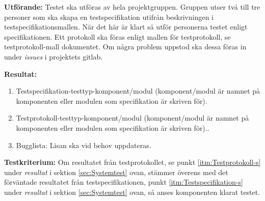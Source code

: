 \documentclass[a4paper,10pt]{article}
\begin{document}
\textbf{Utförande:} Testet ska utföras av hela projektgruppen. Gruppen utser två till tre personer som ska skapa en testspecifikation utifrån beskrivningen i testspecifikationsmallen. När det här är klart så utför personerna testet enligt specifikationen. Ett protokoll ska föras enligt mallen för testprotokoll, se testprotokoll-mall dokumentet. Om några problem uppstod ska dessa föras in under \emph{issues} i projektets gitlab.

\textbf{Resultat:}
    \begin{enumerate}
        \item \label{itm:Testspecifikation-a} Testspecifikation-testtyp-komponent/modul (komponent/modul är namnet på komponenten eller modulen som specifikation är skriven för).
        \item \label{itm:Testprotokoll-a} Testprotokoll-testtyp-komponent/modul (komponent/modul är namnet på komponenten eller modulen som specifikation är skriven för)..
        \item Bugglista: Lisan ska vid behov uppdateras.
    \end{enumerate}

\textbf{Testkriterium:} Om resultatet från testprotokollet, se punkt \ref{itm:Testprotokoll-s} under \emph{resultat} i sektion \ref{sec:Systemtest} ovan, stämmer överens med det förväntade resultatet från testspecifikationen, punkt \ref{itm:Testspecifikation-s} under \emph{resultat} i sektion \ref{sec:Systemtest} ovan, så anses komponenten klarat testet.
\end{document}

